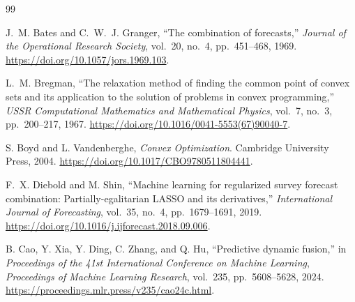 \documentclass[10pt]{article}
\begin{document}
\begin{thebibliography}{99}

J.~M. Bates and C.~W.~J. Granger,
``The combination of forecasts,''
\emph{Journal of the Operational Research Society},
vol.~20, no.~4, pp.~451--468, 1969.
\url{https://doi.org/10.1057/jors.1969.103}.

L.~M. Bregman,
``The relaxation method of finding the common point of convex sets and its
application to the solution of problems in convex programming,''
\emph{USSR Computational Mathematics and Mathematical Physics},
vol.~7, no.~3, pp.~200--217, 1967.
\url{https://doi.org/10.1016/0041-5553(67)90040-7}.

S. Boyd and L. Vandenberghe,
\emph{Convex Optimization}.
Cambridge University Press, 2004.
\url{https://doi.org/10.1017/CBO9780511804441}.

F.~X. Diebold and M. Shin,
``Machine learning for regularized survey forecast combination:
Partially-egalitarian LASSO and its derivatives,''
\emph{International Journal of Forecasting},
vol.~35, no.~4, pp.~1679--1691, 2019.
\url{https://doi.org/10.1016/j.ijforecast.2018.09.006}.

B. Cao, Y. Xia, Y. Ding, C. Zhang, and Q. Hu,
``Predictive dynamic fusion,''
in \emph{Proceedings of the 41st International Conference on Machine Learning},
\emph{Proceedings of Machine Learning Research},
vol.~235, pp.~5608--5628, 2024.
\url{https://proceedings.mlr.press/v235/cao24c.html}.


\end{thebibliography}
\end{document}
